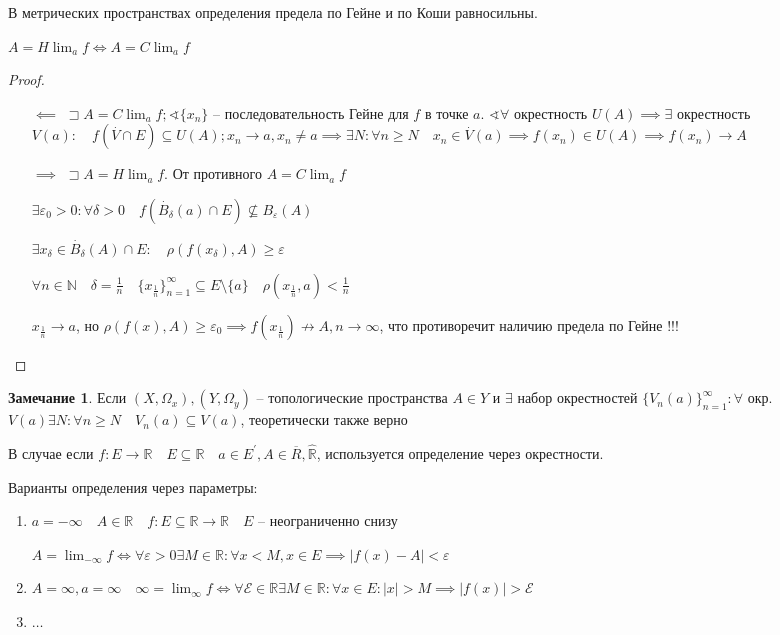 \documentclass{book}
\newcommand\N{\ensuremath{\mathbb{N}}}
\newcommand\R{\ensuremath{\mathbb{R}}}
\newcommand{\p}[1]{#1^{\prime}}
\newcommand{\ov}[1]{\overline{#1}}
\theoremstyle{definition}
\newtheorem*{note}{Замечание}
\begin{document}
\begin{theorem}
    В метрических пространствах определения предела по Гейне и по Коши равносильны.

    $A = H\lim_af \iff A =C\lim_af $
\end{theorem}
\begin{proof}
    \begin{itemize}
        \item []
        \item [$\impliedby $] $\sqsupset A = C\lim_af; \sphericalangle \{x_{n} \}$ -- последовательность Гейне для $f$  в точке  $a$.  $\sphericalangle \forall $ окрестность $U(A) \implies \exists $ окрестность $V(a):\quad f\left( \overset{\cdot }V\cap E \right) \subseteq U(A); x_{n} \to a, x_{n} \neq a \implies \exists N: \forall n\geqslant N\quad x_{n} \in \overset{\cdot }V(a) \implies  f(x_{n} )\in U(A) \implies f(x_{n} )\to A$
        \item [$\implies $] $\sqsupset A = H\lim_af$. От противного  $A = C\lim_af$

            $\exists \varepsilon_0>0:\forall \delta>0\quad f\left(\overset{\cdot }B_{\delta}(a) \cap E \right)\not\subseteq B_{\varepsilon}(A) $ 

            $\exists x_{\delta}\in \overset{\cdot }B_{\delta}(A)\cap E:\quad \rho\left( f(x_{\delta}), A \right) \geqslant \varepsilon$

            $\forall n\in \N \quad \delta = \frac{1}{n}\quad \{x_{\frac{1}{n}}\}_{n=1}^{\infty }\subseteq E\setminus \{a\}\quad \rho\left( x_{\frac{1}{n}}, a \right) <\frac{1}{n}$ 

                $x_{\frac{1}{n}}\to a$, но $\rho\left( f(x), A \right) \geqslant \varepsilon_0 \implies f\left( x_{\frac{1}{n}} \right) \not\to A, n\to \infty $, что противоречит наличию предела по Гейне !!!
    \end{itemize}
\end{proof}

\begin{note}
    Если  $(X, \Omega_x), (Y, \Omega_y)$ -- топологические пространства  $A\in Y$ и $\exists $ набор окрестностей $\{V_n(a)\}_{n=1}^{\infty }:\forall $ окр. $V(a) \exists N: \forall n\geqslant N\quad V_n(a)\subseteq V(a)$, теоретически также верно
\end{note}

В случае если $f:E\to \R\quad E\subseteq \R\quad a\in \p E, A\in \ov R, \widehat{\R}$, используется определение через окрестности.

Варианты определения через параметры:
\begin{enumerate}
    \item $a = -\infty \quad A\in \R\quad f:E\subseteq \R\to \R\quad E$ -- неограниченно снизу

        $A = \lim_{-\infty }f \iff \forall \varepsilon>0\exists M\in \R:\forall x<M, x\in E \implies \left| f(x)-A \right| <\varepsilon$
    \item $A = \infty , a = \infty \quad \infty  = \lim_{\infty } f \iff \forall \mathscr{E}\in \R\exists M\in \R: \forall x\in E: \left| x \right| >M \implies \left| f(x) \right| >\mathscr{E}$
    \item $\ldots$
\end{enumerate}
\end{document}
